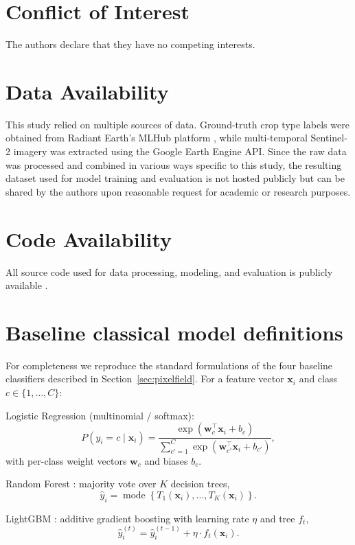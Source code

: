 \documentclass[pdflatex,sn-mathphys]{sn-jnl} %
\begin{document}
\section*{Conflict of Interest}

The authors declare that they have no competing interests.

\section*{Data Availability}

This study relied on multiple sources of data. Ground-truth crop type labels were obtained from Radiant Earth’s MLHub platform \cite{mlhub}, while multi-temporal Sentinel-2 imagery was extracted using the Google Earth Engine API. Since the raw data was processed and combined in various ways specific to this study, the resulting dataset used for model training and evaluation is not hosted publicly but can be shared by the authors upon reasonable request for academic or research purposes.

\section*{Code Availability}

All source code used for data processing, modeling, and evaluation is publicly available \cite{primary_repo}.

\appendix

\section{Baseline classical model definitions}
\label{app:models}

For completeness we reproduce the standard formulations of the four baseline
classifiers described in Section~\ref{sec:pixelfield}. For a feature vector
$\mathbf{x}_i$ and class $c\in\{1,\dots,C\}$:

\noindent Logistic Regression \cite{james2013} (multinomial / softmax):
\[
P(y_i = c \mid \mathbf{x}_i) =
\frac{\exp(\mathbf{w}_c^\top \mathbf{x}_i + b_c)}
{\sum_{c'=1}^{C} \exp(\mathbf{w}_{c'}^\top \mathbf{x}_i + b_{c'})},
\]
with per-class weight vectors $\mathbf{w}_c$ and biases $b_c$.

\noindent Random Forest \cite{breiman2001}: majority vote over $K$ decision trees,
\[
\hat{y}_i = \operatorname{mode}\left\{ T_1(\mathbf{x}_i),\dots, T_K(\mathbf{x}_i) \right\}.
\]

\noindent LightGBM \cite{ke2017}: additive gradient boosting with learning rate $\eta$ and tree $f_t$,
\[
\hat{y}_i^{(t)} = \hat{y}_i^{(t-1)} + \eta \cdot f_t(\mathbf{x}_i).
\]
\end{document}
